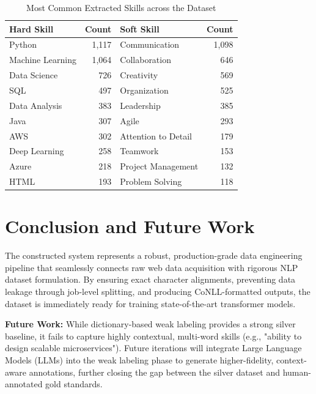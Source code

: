 \documentclass[11pt, a4paper]{article}
\begin{document}
\begin{table}[h]
\centering
\caption{Most Common Extracted Skills across the Dataset}
\begin{tabular}{lr | lr}
\toprule
\textbf{Hard Skill} & \textbf{Count} & \textbf{Soft Skill} & \textbf{Count} \\
\midrule
Python & 1,117 & Communication & 1,098 \\
Machine Learning & 1,064 & Collaboration & 646 \\
Data Science & 726 & Creativity & 569 \\
SQL & 497 & Organization & 525 \\
Data Analysis & 383 & Leadership & 385 \\
Java & 307 & Agile & 293 \\
AWS & 302 & Attention to Detail & 179 \\
Deep Learning & 258 & Teamwork & 153 \\
Azure & 218 & Project Management & 132 \\
HTML & 193 & Problem Solving & 118 \\
\bottomrule
\end{tabular}
\end{table}

\section{Conclusion and Future Work}
The constructed system represents a robust, production-grade data engineering pipeline that seamlessly connects raw web data acquisition with rigorous NLP dataset formulation. By ensuring exact character alignments, preventing data leakage through job-level splitting, and producing CoNLL-formatted outputs, the dataset is immediately ready for training state-of-the-art transformer models.

\textbf{Future Work:}
While dictionary-based weak labeling provides a strong silver baseline, it fails to capture highly contextual, multi-word skills (e.g., "ability to design scalable microservices"). Future iterations will integrate Large Language Models (LLMs) into the weak labeling phase to generate higher-fidelity, context-aware annotations, further closing the gap between the silver dataset and human-annotated gold standards.
\end{document}
